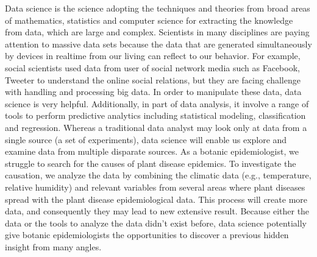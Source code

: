 \documentclass[12pt,a4paper]{article}
\begin{document}
Data science is the science adopting the techniques and theories from broad areas of mathematics, statistics and computer science for extracting the knowledge from data, which are large and complex. Scientists in many disciplines are paying attention to massive data sets because the data that are generated simultaneously by devices in realtime from our living can reflect to our behavior. For example, social scientists used data from user of social network media such as Facebook, Tweeter to understand the online social relations, but they are facing challenge with handling and processing big data. In order to manipulate these data, data science is very helpful. Additionally, in part of data analysis, it involve a range of tools to perform predictive analytics including statistical modeling, classification and regression. Whereas a traditional data analyst may look only at data from a single source (a set of experiments), data science will enable us explore and examine data from multiple disparate sources. As a botanic epidemiologist, we struggle to search for the causes of plant disease epidemics. To investigate the causation, we analyze the data by combining the climatic data (e.g., temperature, relative humidity) and relevant variables from several areas where plant diseases spread with the plant disease epidemiological data. This process will create more data, and consequently they may lead to new extensive result. Because either the data or the tools to analyze the data didn't exist before, data science potentially give botanic epidemiologists the opportunities to discover a previous hidden insight from many angles.
\end{document}
